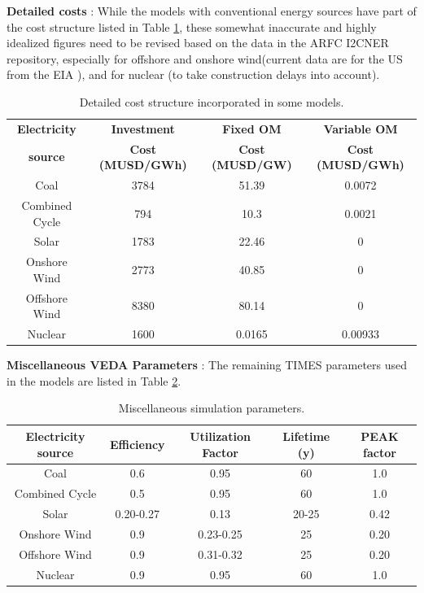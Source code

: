 \documentclass[14pt,a4paper]{article} %
\begin{document}
\textbf{Detailed costs} \cite{noauthor_eia_2019} : While the models with conventional energy sources have part of the cost structure listed in Table \ref{tab:costs}, these somewhat inaccurate and highly idealized figures need to be revised based on the data in the \gls{ARFC} \gls{I2CNER} repository, especially for offshore and onshore wind(current data are for the US from the \gls{EIA} \cite{noauthor_eia_2019}), and for nuclear (to take construction delays into account).

\begin{table}[H]
\centering
\caption{\label{tab:costs} Detailed cost structure incorporated in some models.}
\vspace{2mm}
\begin{tabular}{|c|c|c|c|}
\hline
\textbf{Electricity} & \textbf{Investment} & \textbf{Fixed \gls{OM}} & \textbf{Variable \gls{OM}}\\
\textbf{source} & \textbf{Cost (MUSD/GWh)} & \textbf{Cost (MUSD/GW)} & \textbf{Cost (MUSD/GWh)}\\
\hline
Coal & 3784 & 51.39 & 0.0072\\
\hline
Combined Cycle & 794 & 10.3 & 0.0021\\
\hline
Solar & 1783 & 22.46 & 0 \\
\hline
Onshore Wind & 2773 & 40.85 & 0\\
\hline
Offshore Wind & 8380 & 80.14 & 0\\
\hline
Nuclear & 1600 & 0.0165 & 0.00933\\
\hline
\end{tabular}
\end{table}

\textbf{Miscellaneous VEDA Parameters} \cite{kato_energy_2016,gargiulo_documentation_2005}: The remaining TIMES parameters used in the models are listed in Table \ref{tab:misc}.
\begin{table}[H]
\centering
\caption{\label{tab:misc} Miscellaneous simulation parameters.}
\vspace{2mm}
\begin{tabular}{|c|c|c|c|c|}
\hline
\textbf{Electricity source} & \textbf{Efficiency} & \textbf{Utilization Factor} & \textbf{Lifetime (y)} & \textbf{\gls{PEAK} factor}\\
\hline
Coal & 0.6 & 0.95 & 60 & 1.0 \\
\hline
Combined Cycle & 0.5 & 0.95 & 60 & 1.0 \\
\hline
Solar & 0.20-0.27 & 0.13 & 20-25 & 0.42 \\
\hline
Onshore Wind & 0.9 & 0.23-0.25 & 25 & 0.20 \\
\hline
Offshore Wind & 0.9 & 0.31-0.32 & 25 & 0.20 \\
\hline
Nuclear & 0.9 & 0.95 & 60 & 1.0 \\
\hline
\end{tabular}
\end{table}
\end{document}
